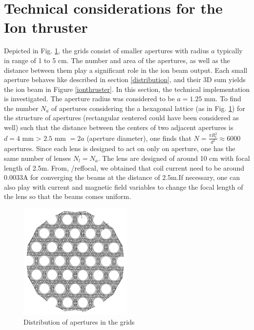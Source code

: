 \documentclass[twocolumn,12pt]{article}
\numberwithin{equation}{section} %
\numberwithin{equation}{section}
\begin{document}
\section{Technical considerations for the Ion thruster}
\label{technicalities}
Depicted in Fig. \ref{aperturegridspic}, the grids consist of smaller apertures with radius $a$ typically in range of 1 to 5 cm. The number and area of the apertures, as well as the distance between them play a significant role in the ion beam output. Each small aperture behaves like described in section \ref{distribution}, and their 3D sum yields the ion beam in Figure \ref{ionthruster}. In this section, the technical implementation is investigated. The aperture radius was considered to be $a = 1.25$ mm. To find the number $N_a$ of apertures considering the a hexagonal lattice (as in Fig. \ref{aperturegridspic}) for the structure of apertures (rectangular centered could have been considered as well) such that the distance between the centers of two adjacent apertures is $d = 4$ mm > $2.5$ mm $= 2a$ (aperture diameter), one finds that $N = \frac{\pi R_t^2}{d ^2} \approx 6 000$ apertures. Since each lens is designed to act on only on aperture, one has the same number of lenses $N_l = N_a$. The lens are designed of around 10 cm with focal length of 2.5m. From, /ref{focal}, we obtained that coil current need to be around 0.0033A for converging the beams at the distance of 2.5m.If necessary, one can also play with current and magnetic field variables to change the focal length of the lens so that the beams comes uniform. 

\begin{figure}[H]
    \centering
    \includegraphics[width=0.5\textwidth]{figs/aperturegrids.png}
    \caption{Distribution of apertures in the grids \cite{aperturegrids}}
    \label{aperturegridspic}
\end{figure}
\end{document}
